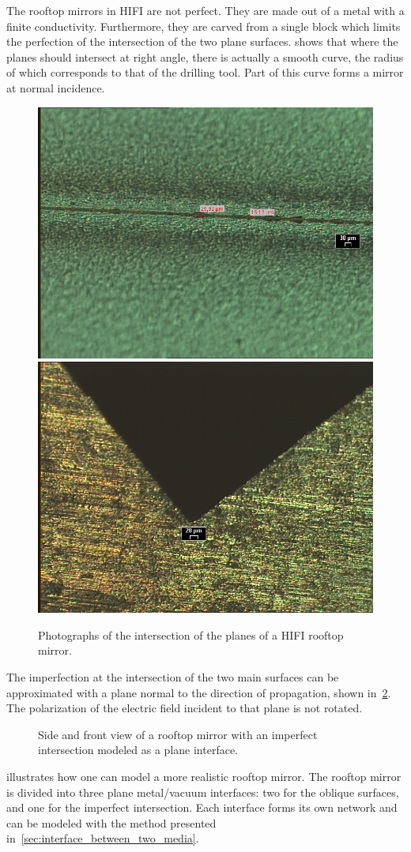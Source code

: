The rooftop mirrors in HIFI are not perfect.
They are made out of a metal with a finite conductivity.
Furthermore, they are carved from a single block which limits the perfection of the intersection of the two plane surfaces.
 shows that where the planes should intersect at right angle, there is actually a smooth curve, the radius of which corresponds to that of the drilling tool.
Part of this curve forms a mirror at normal incidence.
\begin{figure}[hbtp]
    \centering
    \includegraphics[width=.5\textwidth]{rooftop_front}%
    \includegraphics[width=.5\textwidth]{rooftop_side}
    \caption{Photographs of the intersection of the planes of a HIFI rooftop mirror.}
    \label{fig:rooftop_photo}
\end{figure}

The imperfection at the intersection of the two main surfaces can be approximated with a plane normal to the direction of propagation, shown in~\cref{fig:rooftop_imperfect}.
The polarization of the electric field incident to that plane is not rotated.
\begin{figure}[hbtp]
    \centering
    
    \caption{Side and front view of a rooftop mirror with an imperfect intersection modeled as a plane interface.}
    \label{fig:rooftop_imperfect}
\end{figure}

 illustrates how one can model a more realistic rooftop mirror.
The rooftop mirror is divided into three plane metal/vacuum interfaces: two for the oblique surfaces, and one for the imperfect intersection.
Each interface forms its own network and can be modeled with the method presented in~\cref{sec:interface_between_two_media}.

